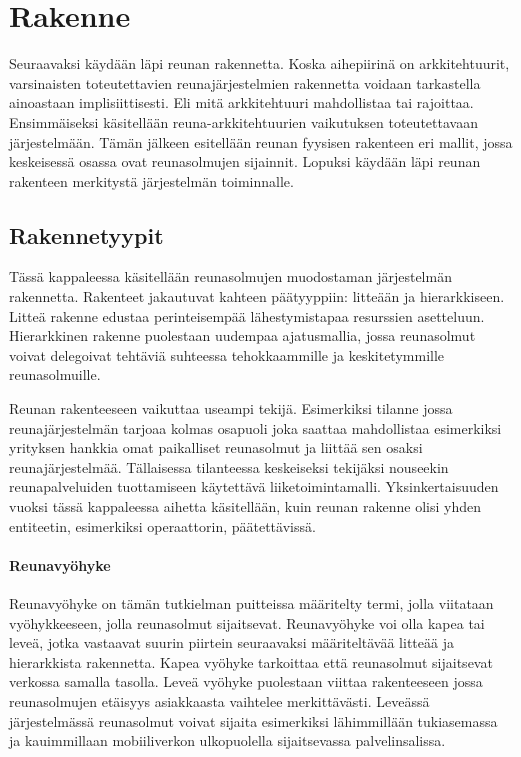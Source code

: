 \section{Rakenne} \label{rakenne}
Seuraavaksi käydään läpi reunan rakennetta.
Koska aihepiirinä on arkkitehtuurit, varsinaisten toteutettavien reunajärjestelmien rakennetta voidaan tarkastella ainoastaan implisiittisesti. 
Eli mitä arkkitehtuuri mahdollistaa tai rajoittaa.
Ensimmäiseksi käsitellään reuna-arkkitehtuurien vaikutuksen toteutettavaan järjestelmään.
Tämän jälkeen esitellään reunan fyysisen rakenteen eri mallit, jossa keskeisessä osassa ovat reunasolmujen sijainnit.
Lopuksi käydään läpi reunan rakenteen merkitystä järjestelmän toiminnalle.


\subsection{Rakennetyypit}
Tässä kappaleessa käsitellään reunasolmujen muodostaman järjestelmän rakennetta. Rakenteet jakautuvat kahteen päätyyppiin: litteään ja hierarkkiseen.
Litteä rakenne edustaa perinteisempää lähestymistapaa resurssien asetteluun. Hierarkkinen rakenne puolestaan uudempaa ajatusmallia, jossa reunasolmut voivat delegoivat tehtäviä suhteessa tehokkaammille ja keskitetymmille reunasolmuille. 

Reunan rakenteeseen vaikuttaa useampi tekijä. 
Esimerkiksi tilanne jossa reunajärjestelmän tarjoaa kolmas osapuoli joka saattaa mahdollistaa esimerkiksi yrityksen hankkia omat paikalliset reunasolmut ja liittää sen osaksi reunajärjestelmää.
Tällaisessa tilanteessa keskeiseksi tekijäksi nouseekin reunapalveluiden tuottamiseen käytettävä liiketoimintamalli. Yksinkertaisuuden vuoksi tässä kappaleessa aihetta käsitellään, kuin reunan rakenne olisi yhden entiteetin, esimerkiksi operaattorin, päätettävissä. 

\paragraph*{Reunavyöhyke}
Reunavyöhyke on tämän tutkielman puitteissa määritelty termi, jolla viitataan vyöhykkeeseen, jolla reunasolmut sijaitsevat. Reunavyöhyke voi olla kapea tai leveä, jotka vastaavat suurin piirtein seuraavaksi määriteltävää litteää ja hierarkkista rakennetta. Kapea vyöhyke tarkoittaa että reunasolmut sijaitsevat verkossa samalla tasolla. Leveä vyöhyke puolestaan viittaa rakenteeseen jossa reunasolmujen etäisyys asiakkaasta vaihtelee merkittävästi. Leveässä järjestelmässä reunasolmut voivat sijaita esimerkiksi lähimmillään tukiasemassa ja kauimmillaan mobiiliverkon ulkopuolella sijaitsevassa palvelinsalissa. 

